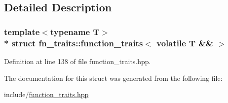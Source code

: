 \subsection{Detailed Description}
\subsubsection*{template$<$typename T$>$\\*
struct fn\+\_\+traits\+::function\+\_\+traits$<$ volatile T \&\& $>$}



Definition at line 138 of file function\+\_\+traits.\+hpp.



The documentation for this struct was generated from the following file\+:\begin{DoxyCompactItemize}
\item 
include/\hyperlink{function__traits_8hpp}{function\+\_\+traits.\+hpp}\end{DoxyCompactItemize}
